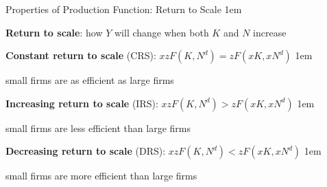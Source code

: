 \documentclass[11pt,aspectratio=43]{beamer}
\let\olditemize=\itemize
\let\endolditemize=\enditemize
\renewenvironment{itemize}{\olditemize \itemsep1em}{\endolditemize}
\theoremstyle{definition}
\begin{document}
\begin{frame}{Properties of Production Function: Return to Scale}
\label{slide:Properties_of_Production_Function__Return_to_Scale}
    \begin{itemize}
        \item \textbf{Return to scale}: how $ Y $ will change when both $ K $ and $ N $ increase
        \item \textbf{Constant return to scale} (CRS): $ x z F( K, N^{d} ) = z F( xK, xN^{d} ) $
        \begin{itemize}
            \item small firms are \alert{as efficient as} large firms
        \end{itemize}
        \item \textbf{Increasing return to scale} (IRS): $ x z F( K, N^{d} ) > z F( xK, xN^{d} ) $
        \begin{itemize}
            \item small firms are \alert{less efficient than} large firms
        \end{itemize}
        \item \textbf{Decreasing return to scale} (DRS): $ x z F( K, N^{d} ) < z F( xK, xN^{d} ) $
        \begin{itemize}
            \item small firms are \alert{more efficient than} large firms
        \end{itemize}
    \end{itemize}
\end{frame}
\end{document}
